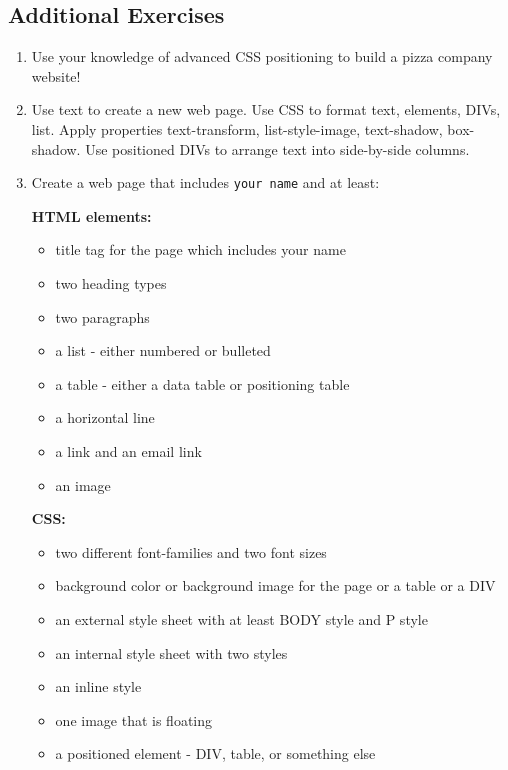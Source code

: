 \documentclass[11pt,a4paper]{article}
\begin{document}
\subsection*{Additional Exercises}
\begin{enumerate}

\item Use your knowledge of advanced CSS positioning to build a pizza company website!

\item Use text to create a new web page. Use CSS to format text, elements, DIVs, list. Apply properties text-transform, list-style-image, text-shadow, box-shadow. Use positioned DIVs to arrange text into side-by-side columns.
\item Create a web page that includes \texttt{your name} and at least:\

\textbf{HTML elements:}
\begin{itemize}
\item title tag for the page which includes your name
\item two heading types
\item two paragraphs
\item a list - either numbered or bulleted
\item a table - either a data table or positioning table
\item a horizontal line
\item a link and an email link
\item an image
\end{itemize}
\textbf{CSS:}
\begin{itemize}
\item two different font-families and two font sizes
\item background color or background image for the page or a table or a DIV
\item an external style sheet with at least BODY style and P style
\item an internal style sheet with two styles
\item an inline style
\item one image that is floating
\item a positioned element - DIV, table, or something else
\end{itemize}
\end{enumerate}
\end{document}
